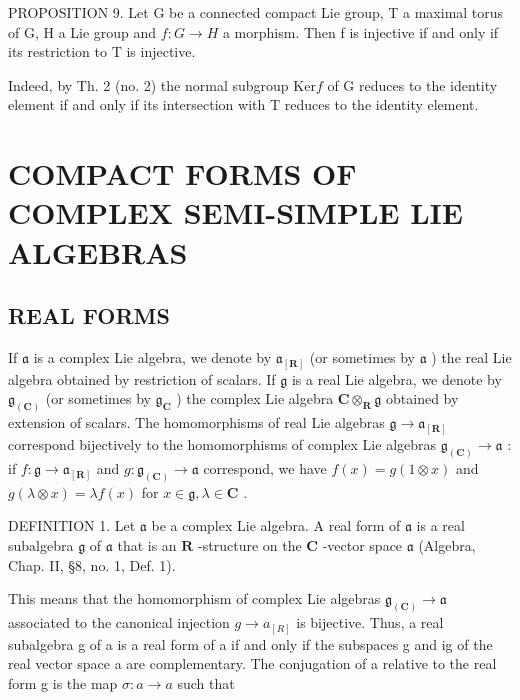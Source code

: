 PROPOSITION 9. Let G be a connected compact Lie group, T a maximal torus of G, H a Lie group and \(f: G \to H\) a morphism. Then f is injective if and only if its restriction to T is injective.

Indeed, by Th. 2 (no. 2) the normal subgroup \(\mathrm{Ker}f\) of G reduces to the identity element if and only if its intersection with T reduces to the identity element.

\section{COMPACT FORMS OF COMPLEX SEMI-SIMPLE LIE ALGEBRAS}

\subsection{REAL FORMS}

If \(\mathfrak{a}\) is a complex Lie algebra, we denote by \(\mathfrak{a}_{[\mathbf{R} ]}\) (or sometimes by \(\mathfrak{a}\) ) the real Lie algebra obtained by restriction of scalars. If \(\mathfrak{g}\) is a real Lie algebra, we denote by \(\mathfrak{g}_{(\mathbf{C})}\) (or sometimes by \(\mathfrak{g}_{\mathbf{C}}\) ) the complex Lie algebra \(\mathbf{C}\otimes_{\mathbf{R}}\mathfrak{g}\) obtained by extension of scalars. The homomorphisms of real Lie algebras \(\mathfrak{g}\to \mathfrak{a}_{[\mathbf{R}]}\) correspond bijectively to the homomorphisms of complex Lie algebras \(\mathfrak{g}_{(\mathbf{C})}\to \mathfrak{a}\) : if \(f:\mathfrak{g}\to \mathfrak{a}_{[\mathbf{R}]}\) and \(g:\mathfrak{g}_{(\mathbf{C})}\to \mathfrak{a}\) correspond, we have \(f(x) = g(1\otimes x)\) and \(g(\lambda \otimes x) = \lambda f(x)\) for \(x\in \mathfrak{g},\lambda \in \mathbf{C}\) .

DEFINITION 1. Let \(\mathfrak{a}\) be a complex Lie algebra. A real form of \(\mathfrak{a}\) is a real subalgebra \(\mathfrak{g}\) of \(\mathfrak{a}\) that is an \(\mathbf{R}\) -structure on the \(\mathbf{C}\) -vector space \(\mathfrak{a}\) (Algebra, Chap. II, §8, no. 1, Def. 1).

This means that the homomorphism of complex Lie algebras \(\mathfrak{g}_{(\mathbf{C})}\to\mathfrak{a}\) associated to the canonical injection \(g\to a_{[R]}\) is bijective. Thus, a real subalgebra g of a is a real form of a if and only if the subspaces g and ig of the real vector space a are complementary. The conjugation of a relative to the real form g is the map \(\sigma:a\to a\) such that

